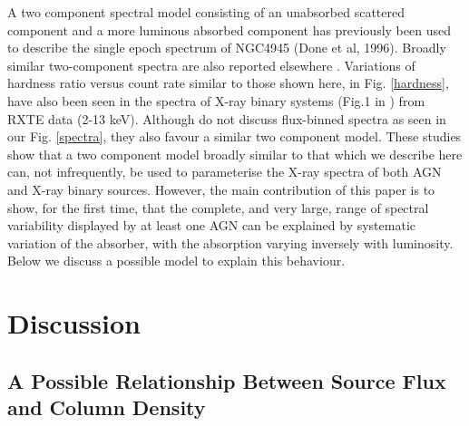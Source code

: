 \documentclass[useAMS,usenatbib]{sam}
\begin{document}

A two component spectral model consisting of an unabsorbed scattered component and a more luminous absorbed component has previously been used to describe the single
epoch spectrum of NGC4945 (Done et al, 1996). Broadly similar two-component spectra are also reported elsewhere  \citep[e.g. NGC4507,][]{braito}. Variations of
hardness
ratio versus count rate similar to those shown here, in Fig. \ref{hardness}, have also been seen in the spectra of X-ray binary systems (Fig.1 in \citealt{kuulkers})
from RXTE data (2-13 keV). Although	\citet{kuulkers} do not discuss flux-binned spectra as seen in our Fig. \ref{spectra}, they also favour a similar two component
model. These studies show that a two component model broadly similar to that which we describe here can, not infrequently, be used to parameterise the X-ray spectra of
both AGN and X-ray binary sources. However, the main contribution of this paper is to show, for the first time, that the complete, and very large, range of spectral
variability displayed by at least one AGN can be explained by systematic variation of the absorber, with the absorption varying inversely with luminosity. Below we
discuss a possible model to explain this behaviour. 


\section{Discussion}


\subsection{A Possible Relationship Between Source Flux and Column Density}
	
\end{document}
